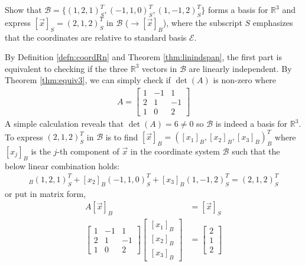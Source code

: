 \begin{exmp}
\label{exmp:basisR3}
Show that $\mathcal{B} = \{(1,2,1)_S^T, (-1,1,0)_S^T, (1,-1,2)_S^T\}$ forms a basis for $\mathbb{R}^3$ and express $[\vec{x}]_S = (2,1,2)_S^T$ in $\mathcal{B}$ ($\rightarrow [\vec{x}]_B$), where the subscript $S$ emphasizes that the coordinates are relative to standard basis $\mathcal{E}$.
\end{exmp}
\begin{solution}
By Definition \ref{defn:coordRn} and Theorem \ref{thm:linindspan}, the first part is equivalent to checking if the three $\mathbb{R}^3$ vectors in $\mathcal{B}$ are linearly independent. By Theorem \ref{thm:equiv3}, we can simply check if $\det(A)$ is non-zero where 
\begin{align*}
A = 
\begin{bmatrix}
1 & -1 & 1 \\
2 & 1 & -1 \\
1 & 0 & 2
\end{bmatrix}
\end{align*}
A simple calculation reveals that $\det(A) = 6 \neq 0$ so $\mathcal{B}$ is indeed a basis for $\mathbb{R}^3$. To express $(2,1,2)_S^T$ in $\mathcal{B}$ is to find $[\vec{x}]_B = ([x_1]_B, [x_2]_B, [x_3]_B)_B^T$ where $[x_j]_B$ is the $j$-th component of $\vec{x}$ in the coordinate system $\mathcal{B}$ such that the below linear combination holds:
\begin{align*}
[x_1]_B(1,2,1)_S^T + [x_2]_B(-1,1,0)_S^T + [x_3]_B(1,-1,2)_S^T = (2,1,2)_S^T
\end{align*}
or put in matrix form,
\begin{align*}
A[\vec{x}]_B &= [\vec{x}]_S \\
\begin{bmatrix}
1 & -1 & 1 \\
2 & 1 & -1 \\
1 & 0 & 2
\end{bmatrix}
\begin{bmatrix}
[x_1]_B \\
[x_2]_B \\
[x_3]_B
\end{bmatrix}
&=
\begin{bmatrix}
2 \\
1 \\
2
\end{bmatrix}
\end{align*}

\end{solution}
